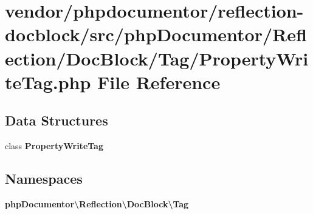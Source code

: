 \section{vendor/phpdocumentor/reflection-\/docblock/src/php\+Documentor/\+Reflection/\+Doc\+Block/\+Tag/\+Property\+Write\+Tag.php File Reference}
\label{_property_write_tag_8php}
\subsection*{Data Structures}
\begin{DoxyCompactItemize}
\item 
class {\bf Property\+Write\+Tag}
\end{DoxyCompactItemize}
\subsection*{Namespaces}
\begin{DoxyCompactItemize}
\item 
 {\bf php\+Documentor\textbackslash{}\+Reflection\textbackslash{}\+Doc\+Block\textbackslash{}\+Tag}
\end{DoxyCompactItemize}
